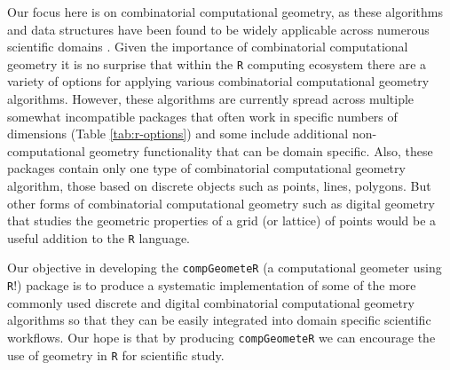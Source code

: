 \documentclass[12pt, a4paper]{article}
\begin{document}
Our focus here is on combinatorial computational geometry, as these algorithms and data structures have been found to be widely applicable across numerous scientific domains \citep{de-berg-2008}.  Given the importance of combinatorial computational geometry it is no surprise that within the \texttt{R} \citep{r-core-team-2019} computing ecosystem there are a variety of options for applying various combinatorial computational geometry algorithms.  However, these algorithms are currently spread across multiple somewhat incompatible packages that often work in specific numbers of dimensions (Table \ref{tab:r-options}) and some include additional non-computational geometry functionality that can be domain specific.  Also, these packages contain only one type of combinatorial computational geometry algorithm, those based on discrete objects such as points, lines, polygons.  But other forms of combinatorial computational geometry such as digital geometry that studies the geometric properties of a grid (or lattice) of points \citep{rosenfeld-1989, klette-2004} would be a useful addition to the \texttt{R} language.

Our objective in developing the \texttt{compGeometeR} (a computational geometer using \texttt{R}!) package is to produce a systematic implementation of some of the more commonly used discrete and digital combinatorial computational geometry algorithms so that they can be easily integrated into domain specific scientific workflows.  Our hope is that by producing \texttt{compGeometeR} we can encourage the use of geometry in \texttt{R} for scientific study.
\end{document}
